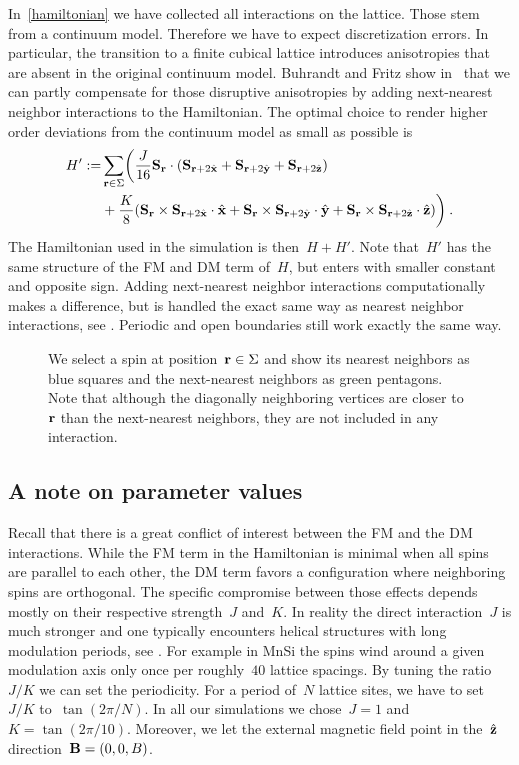 In~\eqref{hamiltonian} we have collected all interactions on the lattice. Those
stem from a continuum model. Therefore we have to expect discretization errors.
In particular, the transition to a finite cubical lattice introduces
anisotropies that are absent in the original continuum model. Buhrandt and Fritz
show in~\cite{skyrmionlattice} that we can partly compensate for those
disruptive anisotropies by adding next-nearest neighbor interactions to the
Hamiltonian. The optimal choice to render higher order deviations from the
continuum model as small as possible is
%
\begin{align}\label{hamiltonianfull}
  H' := & \sum_{\mathbf{r} \in \Sigma} \biggl(
  \frac{J}{16} \mathbf{S}_{\mathbf{r}} \cdot (\mathbf{S}_{\mathbf{r}+2\hat{\mathbf{x}}} + \mathbf{S}_{\mathbf{r}+2\hat{\mathbf{y}}} + \mathbf{S}_{\mathbf{r}+2\hat{\mathbf{z}}}) \\
  &+ \frac{K}{8} (\mathbf{S}_{\mathbf{r}} \times \mathbf{S}_{\mathbf{r}+2\hat{\mathbf{x}}} \cdot \hat{\mathbf{x}} +
        \mathbf{S}_{\mathbf{r}} \times \mathbf{S}_{\mathbf{r}+2\hat{\mathbf{y}}} \cdot \hat{\mathbf{y}} +
        \mathbf{S}_{\mathbf{r}} \times \mathbf{S}_{\mathbf{r}+2\hat{\mathbf{z}}} \cdot \hat{\mathbf{z}})\biggr)\:.
\end{align}
%
The Hamiltonian used in the simulation is then~$H + H'$. Note that~$H'$ has the
same structure of the FM and DM term of~$H$, but enters with smaller constant
and opposite sign. Adding next-nearest neighbor interactions computationally
makes a difference, but is handled the exact same way as nearest neighbor
interactions, see . Periodic and open boundaries still work
exactly the same way.

\begin{figure}
  \centering
  \caption{We select a spin at position~$\mathbf{r} \in \Sigma$ and show its nearest
  neighbors as blue squares and the next-nearest neighbors as green pentagons.
  Note that although the diagonally neighboring vertices are closer to~$\mathbf{r}$ than
  the next-nearest neighbors, they are not included in any interaction.}
\label{fig:interact}
\end{figure}

\subsection{A note on parameter values}

Recall that there is a great conflict of interest between the FM and
the DM interactions. While the FM term in the Hamiltonian is minimal when all
spins are parallel to each other, the DM term favors a configuration where
neighboring spins are orthogonal. The specific compromise between those effects
depends mostly on their respective strength~$J$ and~$K$. In reality the direct
interaction~$J$ is much stronger and one typically encounters helical
structures with long modulation periods, see .  For example in MnSi the spins wind
around a given modulation axis only once per roughly~$40$ lattice spacings. By
tuning the ratio~$J/K$ we can set the periodicity. For a period of~$N$ lattice
sites, we have to set~$J/K$ to~$\tan(2\pi / N)$. In all our simulations we
chose~$J=1$ and~$K=\tan(2\pi / 10)$. Moreover, we let the external magnetic
field point in the~$\hat{\mathbf{z}}$ direction~$\mathbf{B}=(0,0,B)$.

